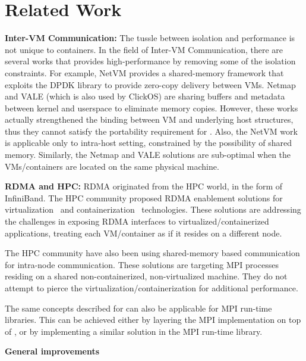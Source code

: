 \section{Related Work} \label{sec:related}


\textbf{Inter-VM Communication:} 
The tussle between isolation and performance is not unique to containers.
In the field of Inter-VM Communication, there are several works that provides
high-performance by removing some of the isolation constraints.
For example, NetVM\cite{netvm} provides a shared-memory framework that
exploits the DPDK library to provide zero-copy delivery between VMs.
Netmap\cite{netmap} and VALE\cite{vale} (which is also used by ClickOS\cite{clickos}) 
are sharing buffers and metadata between kernel and userspace to eliminate memory copies.
However, these works actually strengthened the binding between VM and underlying host
structures, thus they cannot satisfy the portability requirement for \sysname. 
Also, the NetVM work is applicable only to intra-host setting,
constrained by the possibility of shared memory. Similarly, the Netmap
and VALE solutions are sub-optimal when the VMs/containers are located
on the same physical machine.

\textbf{RDMA and HPC:} RDMA originated from the HPC world, in the form of InfiniBand. The HPC
community proposed RDMA enablement solutions for
virtualization~\cite{ranadive2012toward} and
containerization~\cite{rdmacontainers} technologies. These solutions
are addressing the challenges in exposing RDMA interfaces to
virtualized/containerized applications, treating each VM/container as
if it resides on a different node.

The HPC community have also been using shared-memory based
communication~\cite{KNEM,MPI:p:MPI,HybridMPI} for intra-node
communication. These solutions are targeting MPI processes residing on
a shared non-containerized, non-virtualized machine. They do not
attempt to pierce the virtualization/containerization for additional
performance.

The same concepts described for \sysname can also be applicable for
MPI run-time libraries. This can be achieved either by layering the
MPI implementation on top of \sysname, or by implementing a similar
solution in the MPI run-time library.

\textbf{General improvements}

